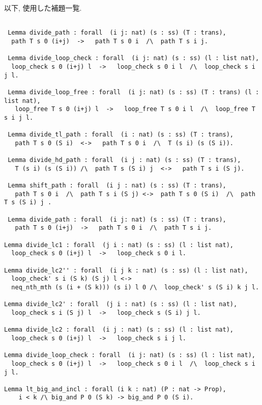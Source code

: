 \documentclass{jsarticle}
\begin{document}
\newpage

以下, 使用した補題一覧. 

\begin{lstlisting}[language = Coq,  frame=tb, framesep=5pt, breaklines = true] % path
 
 Lemma divide_path : forall  (i j: nat) (s : ss) (T : trans),
  path T s 0 (i+j)  ->   path T s 0 i  /\  path T s i j.
 
 Lemma divide_loop_check : forall  (i j: nat) (s : ss) (l : list nat),
  loop_check s 0 (i+j) l  ->   loop_check s 0 i l  /\  loop_check s i j l.
 
 Lemma divide_loop_free : forall  (i j: nat) (s : ss) (T : trans) (l : list nat),
   loop_free T s 0 (i+j) l  ->   loop_free T s 0 i l  /\  loop_free T s i j l.
  
 Lemma divide_tl_path : forall  (i : nat) (s : ss) (T : trans),
   path T s 0 (S i)  <->   path T s 0 i  /\  T (s i) (s (S i)).

 Lemma divide_hd_path : forall  (i j : nat) (s : ss) (T : trans),
   T (s i) (s (S i)) /\  path T s (S i) j  <->   path T s i (S j).

 Lemma shift_path : forall  (i j : nat) (s : ss) (T : trans), 
   path T s 0 i  /\  path T s i (S j) <->  path T s 0 (S i)  /\  path T s (S i) j .

 Lemma divide_path : forall  (i j: nat) (s : ss) (T : trans),
   path T s 0 (i+j)  ->   path T s 0 i  /\  path T s i j.

Lemma divide_lc1 : forall  (j i : nat) (s : ss) (l : list nat), 
  loop_check s 0 (i+j) l  ->   loop_check s 0 i l.

Lemma divide_lc2'' : forall  (i j k : nat) (s : ss) (l : list nat),
  loop_check' s i (S k) (S j) l <->
  neq_nth_mth (s (i + (S k))) (s i) l 0 /\  loop_check' s (S i) k j l.

Lemma divide_lc2' : forall  (j i : nat) (s : ss) (l : list nat),
  loop_check s i (S j) l  ->   loop_check s (S i) j l.

Lemma divide_lc2 : forall  (i j : nat) (s : ss) (l : list nat),
  loop_check s 0 (i+j) l  ->   loop_check s i j l.

Lemma divide_loop_check : forall  (i j: nat) (s : ss) (l : list nat),
  loop_check s 0 (i+j) l  ->   loop_check s 0 i l  /\  loop_check s i j l.

Lemma lt_big_and_incl : forall (i k : nat) (P : nat -> Prop),
    i < k /\ big_and P 0 (S k) -> big_and P 0 (S i).
\end{lstlisting}
\end{document}
